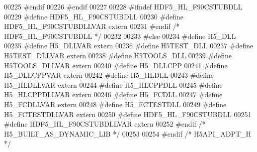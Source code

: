 \begin{DoxyCode}
00225 \textcolor{preprocessor}{  #endif}
00226 \textcolor{preprocessor}{#endif}
00227 
00228 \textcolor{preprocessor}{#ifndef HDF5\_HL\_F90CSTUBDLL}
00229 \textcolor{preprocessor}{  #define HDF5\_HL\_F90CSTUBDLL}
00230 \textcolor{preprocessor}{  #define HDF5\_HL\_F90CSTUBDLLVAR extern}
00231 \textcolor{preprocessor}{#endif }\textcolor{comment}{/* HDF5\_HL\_F90CSTUBDLL */}\textcolor{preprocessor}{}
00232 
00233 \textcolor{preprocessor}{#else}
00234 \textcolor{preprocessor}{  #define H5\_DLL}
00235 \textcolor{preprocessor}{  #define H5\_DLLVAR extern}
00236 \textcolor{preprocessor}{  #define H5TEST\_DLL}
00237 \textcolor{preprocessor}{  #define H5TEST\_DLLVAR extern}
00238 \textcolor{preprocessor}{  #define H5TOOLS\_DLL}
00239 \textcolor{preprocessor}{  #define H5TOOLS\_DLLVAR extern}
00240 \textcolor{preprocessor}{  #define H5\_DLLCPP}
00241 \textcolor{preprocessor}{  #define H5\_DLLCPPVAR extern}
00242 \textcolor{preprocessor}{  #define H5\_HLDLL}
00243 \textcolor{preprocessor}{  #define H5\_HLDLLVAR extern}
00244 \textcolor{preprocessor}{  #define H5\_HLCPPDLL}
00245 \textcolor{preprocessor}{  #define H5\_HLCPPDLLVAR extern}
00246 \textcolor{preprocessor}{  #define H5\_FCDLL}
00247 \textcolor{preprocessor}{  #define H5\_FCDLLVAR extern}
00248 \textcolor{preprocessor}{  #define H5\_FCTESTDLL}
00249 \textcolor{preprocessor}{  #define H5\_FCTESTDLLVAR extern}
00250 \textcolor{preprocessor}{  #define HDF5\_HL\_F90CSTUBDLL}
00251 \textcolor{preprocessor}{  #define HDF5\_HL\_F90CSTUBDLLVAR extern}
00252 \textcolor{preprocessor}{#endif }\textcolor{comment}{/* H5\_BUILT\_AS\_DYNAMIC\_LIB */}\textcolor{preprocessor}{}
00253 
00254 \textcolor{preprocessor}{#endif }\textcolor{comment}{/* H5API\_ADPT\_H */}\textcolor{preprocessor}{}
\end{DoxyCode}
